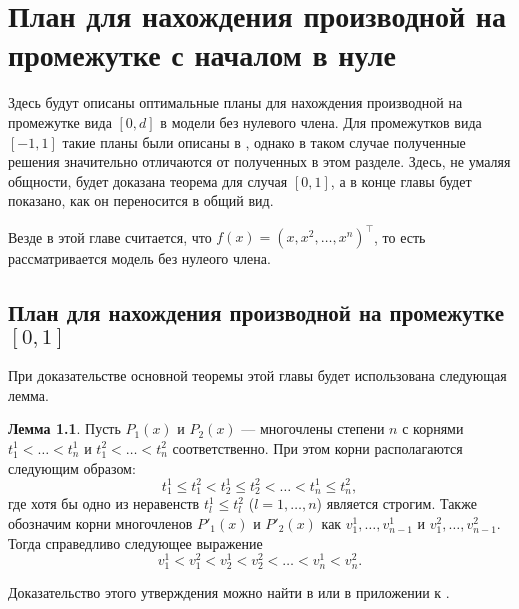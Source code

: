 \documentclass[specialist,
               substylefile = spbu.rtx,
               subf,href,colorlinks=true, 12pt]{disser}
\theoremstyle{definition}
\newtheorem{lemma}{Лемма}
\begin{document}
	
	
	
	
	
	
  
	\chapter{План для нахождения производной на промежутке с началом в нуле}
  
  Здесь будут описаны оптимальные планы для нахождения производной на промежутке вида $[0, d]$ в модели без нулевого члена. Для промежутков вида $[-1, 1] $ такие планы были описаны в \cite{melasmain}, однако в таком случае полученные решения значительно отличаются от полученных в этом разделе. Здесь, не умаляя общности, будет доказана теорема для случая $[0, 1]$, а в конце главы будет показано, как он переносится в общий вид. 
  
  Везде в этой главе считается, что $f(x) = (x, x^2, \ldots, x^n)^\top$, то есть рассматривается модель без нулеого члена.
  
  \section{План для нахождения производной на промежутке $[0, 1]$}
  
  При доказательстве основной теоремы этой главы будет использована следующая лемма.
  
  \begin{lemma}
  \label{lemma:droots}
  	Пусть $P_1(x)$ и $P_2(x)$ --- многочлены степени $n$ с корнями $t^1_1 < \ldots < t^1_n$ и $t^2_1 < \ldots < t^2_n$ соответственно. При этом корни располагаются следующим образом:
  	\begin{equation*}
  		t^1_1 \leqslant t^2_1 < t^1_2 \leqslant t^2_2 < \ldots < t^1_n \leqslant t^2_n,
  	\end{equation*}
  	где хотя бы одно из неравенств $t_l^1 \leqslant t_l^2$ ($l = 1, \ldots, n$) является строгим. Также обозначим корни многочленов $P'_1(x)$ и $P'_2(x)$ как $v_1^1, \ldots, v_{n-1}^1$ и $v_1^2, \ldots, v_{n-1}^2$. Тогда справедливо следующее выражение
  	\begin{equation*}
  		v^1_1 < v^2_1 < v^1_2 < v^2_2 < \ldots < v^1_n < v^2_n.
  	\end{equation*}
  \end{lemma}
  Доказательство этого утверждения можно найти в \cite{sahmphd} или в приложении к \cite{melasmain}.
	
\end{document}
